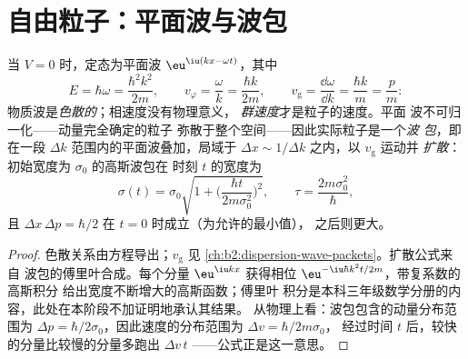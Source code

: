 \section{自由粒子：平面波与波包}

\begin{proposition}[自由粒子]\label{prop:b2:schrodinger-wave-functions:free}
当 $V = 0$ 时，定态为平面波 $\eu^{\iu(kx -
\omega t)}$，其中
\[
E = \hbar\omega = \frac{\hbar^2k^2}{2m}, \qquad
v_\varphi = \frac{\omega}{k} = \frac{\hbar k}{2m}, \qquad
v_{\text{g}} = \frac{\dd\omega}{\dd k} = \frac{\hbar k}{m} = \frac{p}{m} :
\]
物质波是\emph{色散的}；相速度没有物理意义，
\emph{群速度}才是粒子的速度。平面
波不可归一化——动量完全确定的粒子
弥散于整个空间——因此实际粒子是一个\emph{波
包}，即在一段
$\Delta k$ 范围内的平面波叠加，局域于 $\Delta x \sim 1/\Delta k$ 之内，以 $v_{\text{g}}$ 运动并
\emph{扩散}：初始宽度为 $\sigma_0$ 的高斯波包在
时刻 $t$ 的宽度为
\[
\sigma(t) = \sigma_0\sqrt{1 + \Big(\frac{\hbar t}{2m\sigma_0^2}\Big)^2}, \qquad
\tau = \frac{2m\sigma_0^2}{\hbar} ,
\]
且 $\Delta x\,\Delta p = \hbar/2$ 在 $t = 0$ 时成立（为允许的最小值），
之后则更大。
\end{proposition}

\begin{proof}
色散关系由方程导出；$v_{\text{g}}$ 见
\cref{ch:b2:dispersion-wave-packets}。扩散公式来自
波包的傅里叶合成。每个分量 $\eu^{\iu kx}$
获得相位 $\eu^{-\iu\hbar k^2t/2m}$，带复系数的高斯积分
给出宽度不断增大的高斯函数；傅里叶
积分是本科三年级数学分册的内容，此处在本阶段不加证明地承认其结果。
从物理上看：波包包含的动量分布范围为 $\Delta p
= \hbar/2\sigma_0$，因此速度的分布范围为 $\Delta v = \hbar/2m\sigma_0$，
经过时间 $t$ 后，较快的分量比较慢的分量多跑出 $\Delta v\,t$
——公式正是这一意思。
\end{proof}

